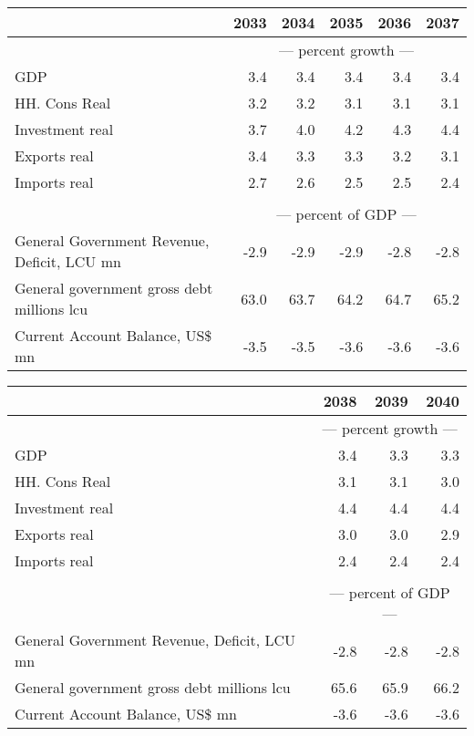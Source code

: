\documentclass{article}
\begin{document}
 \begin{table}[ht]
\begin{tabular}{lrrrrr}
\toprule
 & 2033 & 2034 & 2035 & 2036 & 2037 \\
\midrule
&\multicolumn{5}{c}{--- percent growth ---}                                                                                                     \\
GDP & 3.4 & 3.4 & 3.4 & 3.4 & 3.4 \\
HH. Cons Real & 3.2 & 3.2 & 3.1 & 3.1 & 3.1 \\
Investment real & 3.7 & 4.0 & 4.2 & 4.3 & 4.4 \\
Exports real & 3.4 & 3.3 & 3.3 & 3.2 & 3.1 \\
Imports real & 2.7 & 2.6 & 2.5 & 2.5 & 2.4 \\
&\multicolumn{5}{c}{  }                                                                                                     \\
&\multicolumn{5}{c}{--- percent of GDP ---}                                                                                                     \\
General Government Revenue, Deficit, LCU mn & -2.9 & -2.9 & -2.9 & -2.8 & -2.8 \\
General government gross debt millions lcu & 63.0 & 63.7 & 64.2 & 64.7 & 65.2 \\
Current Account Balance, US\$ mn & -3.5 & -3.5 & -3.6 & -3.6 & -3.6 \\
\bottomrule
\end{tabular}
\end{table}
 \begin{table}[ht]
\begin{tabular}{lrrr}
\toprule
 & 2038 & 2039 & 2040 \\
\midrule
&\multicolumn{3}{c}{--- percent growth ---}                                                             \\
GDP & 3.4 & 3.3 & 3.3 \\
HH. Cons Real & 3.1 & 3.1 & 3.0 \\
Investment real & 4.4 & 4.4 & 4.4 \\
Exports real & 3.0 & 3.0 & 2.9 \\
Imports real & 2.4 & 2.4 & 2.4 \\
&\multicolumn{3}{c}{  }                                                             \\
&\multicolumn{3}{c}{--- percent of GDP ---}                                                             \\
General Government Revenue, Deficit, LCU mn & -2.8 & -2.8 & -2.8 \\
General government gross debt millions lcu & 65.6 & 65.9 & 66.2 \\
Current Account Balance, US\$ mn & -3.6 & -3.6 & -3.6 \\
\bottomrule
\end{tabular}
\end{table}
\end{document}
